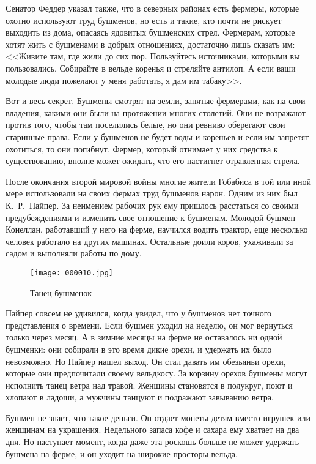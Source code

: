 \documentclass[12pt,a4paper,twoside,openany,svgnames]{memoir}
\begin{document}
Сенатор Феддер указал также, что в северных районах есть фермеры, которые охотно используют труд бушменов, но есть и такие, кто почти не рискует выходить из дома, опасаясь ядовитых бушменских стрел. Фермерам, которые хотят жить с бушменами в добрых отношениях, достаточно лишь сказать им: <<Живите там, где жили до сих пор. Пользуйтесь источниками, которыми вы пользовались. Собирайте в вельде коренья и стреляйте антилоп. А если ваши молодые люди пожелают у меня работать, я дам им табаку>>.

Вот и весь секрет. Бушмены смотрят на земли, занятые фермерами, как на свои владения, какими они были на протяжении многих столетий. Они не возражают против того, чтобы там поселились белые, но они ревниво оберегают свои старинные права. Если у бушменов не будет воды и кореньев и если им запретят охотиться, то они погибнут, Фермер, который отнимает у них средства к существованию, вполне может ожидать, что его настигнет отравленная стрела.

После окончания второй мировой войны многие жители Гобабиса в той или иной мере использовали на своих фермах труд бушменов нарон. Одним из них был К.~Р.~Пайпер. За неимением рабочих рук ему пришлось расстаться со своими предубеждениями и изменить свое отношение к бушменам. Молодой бушмен Конеллан, работавший у него на ферме, научился водить трактор, еще несколько человек работало на других машинах. Остальные доили коров, ухаживали за садом и выполняли работы по дому.

\begin{figure}[ht!]
\centering
\texttt{[image: 000010.jpg]}
\caption{Танец бушменок}
\label{overflow}
\end{figure}


Пайпер совсем не удивился, когда увидел, что у бушменов нет точного представления о времени. Если бушмен уходил на неделю, он мог вернуться только через месяц. А в зимние месяцы на ферме не оставалось ни одной бушменки: они собирали в это время дикие орехи, и удержать их было невозможно. Но Пайпер нашел выход. Он стал давать им обезьяньи орехи, которые они предпочитали своему вельдкосу. За корзину орехов бушмены могут исполнить танец ветра над травой. Женщины становятся в полукруг, поют и хлопают в ладоши, а мужчины танцуют и подражают завыванию ветра.

Бушмен не знает, что такое деньги. Он отдает монеты детям вместо игрушек или женщинам на украшения. Недельного запаса кофе и сахара ему хватает на два дня. Но наступает момент, когда даже эта роскошь больше не может удержать бушмена на ферме, и он уходит на широкие просторы вельда.
\end{document}
